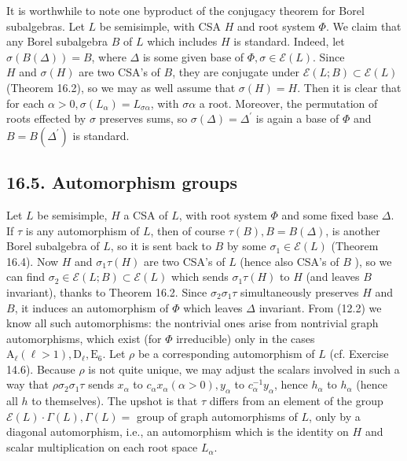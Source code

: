 \documentclass[10pt]{article}
\begin{document}
It is worthwhile to note one byproduct of the conjugacy theorem for Borel subalgebras. Let $L$ be semisimple, with CSA $H$ and root system $\Phi$. We claim that any Borel subalgebra $B$ of $L$ which includes $H$ is standard. Indeed, let $\sigma(B(\Delta))=B$, where $\Delta$ is some given base of $\Phi, \sigma \in \mathscr{E}(L)$. Since\\
$H$ and $\sigma(H)$ are two CSA's of $B$, they are conjugate under $\mathscr{E}(L ; B) \subset \mathscr{E}(L)$ (Theorem 16.2), so we may as well assume that $\sigma(H)=H$. Then it is clear that for each $\alpha>0, \sigma\left(L_{\alpha}\right)=L_{\sigma \alpha}$, with $\sigma \alpha$ a root. Moreover, the permutation of roots effected by $\sigma$ preserves sums, so $\sigma(\Delta)=\Delta^{\prime}$ is again a base of $\Phi$ and $B=B\left(\Delta^{\prime}\right)$ is standard.

\subsection*{16.5. Automorphism groups}
Let $L$ be semisimple, $H$ a CSA of $L$, with root system $\Phi$ and some fixed base $\Delta$. If $\tau$ is any automorphism of $L$, then of course $\tau(B), B=B(\Delta)$, is another Borel subalgebra of $L$, so it is sent back to $B$ by some $\sigma_{1} \in \mathscr{E}(L)$ (Theorem 16.4). Now $H$ and $\sigma_{1} \tau(H)$ are two CSA's of $L$ (hence also CSA's of $B$ ), so we can find $\sigma_{2} \in \mathscr{E}(L ; B) \subset \mathscr{E}(L)$ which sends $\sigma_{1} \tau(H)$ to $H$ (and leaves $B$ invariant), thanks to Theorem 16.2. Since $\sigma_{2} \sigma_{1} \tau$ simultaneously preserves $H$ and $B$, it induces an automorphism of $\Phi$ which leaves $\Delta$ invariant. From (12.2) we know all such automorphisms: the nontrivial ones arise from nontrivial graph automorphisms, which exist (for $\Phi$ irreducible) only in the cases $\mathrm{A}_{\ell}(\ell>1), \mathrm{D}_{\ell}, \mathrm{E}_{6}$. Let $\rho$ be a corresponding automorphism of $L$ (cf. Exercise 14.6). Because $\rho$ is not quite unique, we may adjust the scalars involved in such a way that $\rho \sigma_{2} \sigma_{1} \tau$ sends $x_{\alpha}$ to $c_{\alpha} x_{\alpha}(\alpha>0), y_{\alpha}$ to $c_{\alpha}^{-1} y_{\alpha}$, hence $h_{\alpha}$ to $h_{\alpha}$ (hence all $h$ to themselves). The upshot is that $\tau$ differs from an element of the group $\mathscr{E}(L) \cdot \Gamma(L), \Gamma(L)=$ group of graph automorphisms of $L$, only by a diagonal automorphism, i.e., an automorphism which is the identity on $H$ and scalar multiplication on each root space $L_{\alpha}$.
\end{document}
